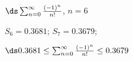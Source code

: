 {$\ds \sum_{n=0}^\infty \frac{(-1)^{n}}{n!}$, \quad $n=6$
}
{$S_6 = 0.3681$; $S_7 = 0.3679$;

$\ds 0.3681 \leq \sum_{n=0}^\infty \frac{(-1)^{n}}{n!} \leq 0.3679$
}